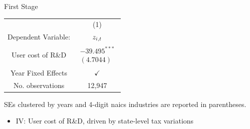 \documentclass[
  aspectratio=169,  %
]{beamer}
\theoremstyle{plain}
\begin{document}
\begin{frame}{First Stage \hyperlink{regression}{}}
  \begin{center}

    \begin{tabular}{cc}
      \hline
      \hline              & (1)\tabularnewline
      Dependent Variable: & $\text{\ensuremath{z_{i,t}}}$\tabularnewline
      \hline
      User cost of R\&D   & $\begin{array}{c}
                                 -39.495^{***} \\
                                 (4.7044)
                               \end{array}$\tabularnewline
      \hline
      Year Fixed Effects  & $\checkmark$\tabularnewline
      No. observations    & 12,947\tabularnewline
      \hline
    \end{tabular}\medskip{}
    \par\end{center}

  {\footnotesize 
  SEs clustered by years and 4-digit naics industries are reported in parentheses.
  }
  \medskip{}
  \begin{itemize}
    \item IV: User cost of R\&D, driven by state-level tax variations \citep{Wilson2009-ri,Bloom2013-pn}
  \end{itemize}

\end{frame}
\end{document}
